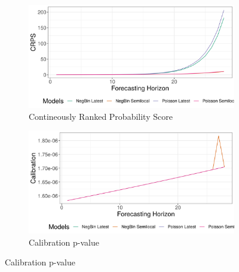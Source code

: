 \begin{figure}[H]
\begin{subfigure}{0.5\textwidth}
  \centering
  \includegraphics[width=\linewidth]{../output/Mandima_crps.png}  
  \caption{Contineously Ranked Probability Score}
  \label{fig:sub-first}
\end{subfigure}
\begin{subfigure}{0.5\textwidth}
  \centering
  \includegraphics[width=\linewidth]{../output/Mandima_calibration.png}  
  \caption{Calibration p-value}
  \label{fig:sub-second}
\end{subfigure}


\end{figure}
